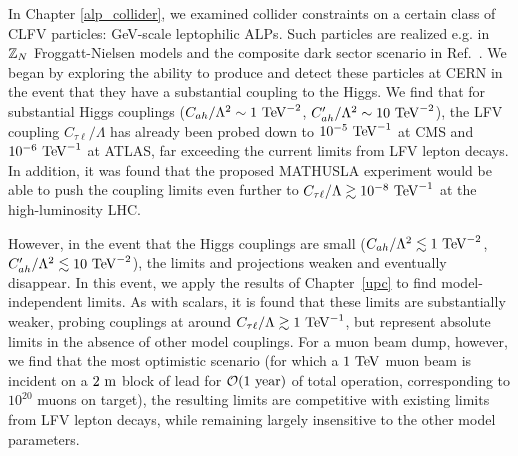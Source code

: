 In Chapter \ref{alp_collider}, we examined collider constraints on a certain class of CLFV particles: GeV-scale leptophilic ALPs. Such particles are realized e.g. in ${\Bbb Z}_N$ Froggatt-Nielsen models \cite{Greljo:2024evt} and the composite dark sector scenario in Ref.~\cite{Davoudiasl:2017zws}. We began by exploring the ability to produce and detect these particles at CERN in the event that they have a substantial coupling to the Higgs. We find that for substantial Higgs couplings ($C_{ah}/\Lambda^2 \sim 1~{\rm TeV}^{-2}$, $C_{ah}'/\Lambda^2 \sim 10~{\rm TeV}^{-2}$), the LFV coupling $C_{\tau \ell}/\Lambda$ has already been probed down to $10^{-5}~{\rm TeV}^{-1}$ at CMS and $10^{-6}~{\rm TeV}^{-1}$ at ATLAS, far exceeding the current limits from LFV lepton decays. In addition, it was found that the proposed MATHUSLA experiment would be able to push the coupling limits even further to $C_{\tau \ell}/\Lambda \gtrsim 10^{-8}~{\rm TeV}^{-1}$ at the high-luminosity LHC.

However, in the event that the Higgs couplings are small ($C_{ah}/\Lambda^2 \lesssim 1~{\rm TeV}^{-2}$, $C_{ah}'/\Lambda^2 \lesssim 10~{\rm TeV}^{-2} $), the limits and projections weaken and eventually disappear. In this event, we apply the results of Chapter~\ref{upc} to find model-independent limits. As with scalars, it is found that these limits are substantially weaker, probing couplings at around $C_{\tau\ell}/\Lambda \gtrsim 1~{\rm TeV}^{-1}$, but represent absolute limits in the absence of other model couplings. For a muon beam dump, however, we find that the most optimistic scenario (for which a $1~{\rm TeV}$ muon beam is incident on a $2~{\rm m}$ block of lead for ${\cal O}(1~{\rm year})$ of total operation, corresponding to $10^{20}$ muons on target), the resulting limits are competitive with existing limits from LFV lepton decays, while remaining largely insensitive to the other model parameters.

